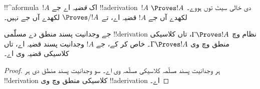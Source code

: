 \documentclass[../../../include/open-logic-section]{subfiles}
\begin{document}
\begin{defn}[قضیے]
!!^a{formula}~$!A$ اک \emph{قضیہ} اے جے !!a{derivation}~$!A$ دی
خالی سیٹ توں ہووے۔ $\Proves !A$ لکھدے آں جے $!A$ قضیہ اے،
تے $\Proves/ !A$ لکھدے آں جے نہیں۔
\end{defn}

\begin{prop}
  جے وجدانیت پسند منطق دے مسلّمی !!{derivation} نظام وچ
  $\Gamma \Proves !A$، تاں کلاسیکی منطق وچ وی $\Gamma \Proves !A$۔
  خاص کر کے، جے $!A$ وجدانیت پسند قضیہ اے، تاں کلاسیکی قضیہ وی اے۔
\end{prop}

\begin{proof}
  ہر وجدانیت پسند مسلّمہ کلاسیکی مسلّمہ وی اے۔ سو وجدانیت پسند منطق
  دی ہر !!{derivation} کلاسیکی منطق وچ وی !!a{derivation} اے۔
\end{proof}
\end{document}
